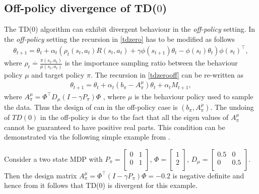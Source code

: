 \subsection{Off-policy divergence of TD($0$)}
The TD($0$) algorithm can exhibit divergent behaviour in the \emph{off-policy} setting. In the \emph{off-policy} setting the recursion in \eqref{tdzero} has to be modified as follows
\begin{align}\label{tdzerooff}
\theta_{t+1}=\theta_t+\alpha_t(\rho_t(s_t,a_t){R(s_t,a_t)+\gamma \phi(s_{t+1})\theta_t-\phi(s_t)\theta_t}){\phi(s_t)}^\top,
\end{align}
where $\rho_t\stackrel{\cdot}{=}\frac{\pi(s_t,a_t)}{\mu(s_t,a_t)}$ is the importance sampling ratio between the behaviour policy $\mu$ and target policy $\pi$. The recursion in \eqref{tdzerooff} can be re-written as
\begin{align}\label{tdzerooffsa}
\theta_{t+1}=\theta_t+\alpha_t(b_\pi-A^\mu_\pi)\theta_t+\alpha_t M_{t+1},
\end{align}
where $A^{\mu}_\pi=\Phi^\top D_\mu (I-\gamma P_\pi)\Phi$ , where $\mu$ is the behaviour policy used to sample the data. Thus the design of \tdo can in the off-policy case is $(b_\pi,A^\mu_\pi)$.
The undoing of $TD(0)$ in the off-policy is due to the fact that all the eigen values of $A^\mu_\pi$ cannot be guaranteed to have positive real parts. This condition can be demonstrated via the following simple example from \cite{}.
\begin{example}
Consider a two state MDP with $P_\pi=
\begin{bmatrix}
    0       & 1  \\
    0       & 1 \\
\end{bmatrix}$, $\Phi=\begin{bmatrix}
 1  \\
2 \\
\end{bmatrix}$, $D_\mu=
\begin{bmatrix}
    0.5       & 0  \\
    0       &0.5 \\
\end{bmatrix}$. Then the design matrix $A^\mu_\pi=\Phi^\top(I-\gamma P_\pi)\Phi=-0.2$ is negative definite and hence from  it follows that TD($0$) is divergent for this example.

\end{example}
%

